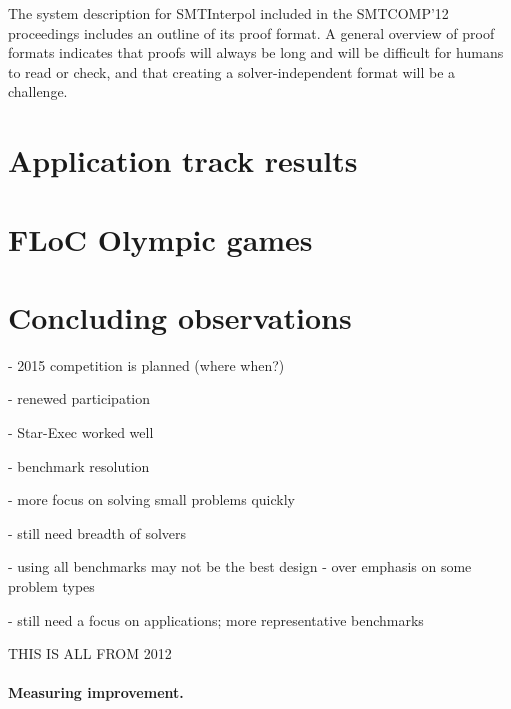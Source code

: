 \documentclass[twosize,11pt]{article}
\begin{document}
The system description for SMTInterpol included in the SMTCOMP'12 proceedings includes an outline of its proof format. A general overview of proof formats indicates that proofs will always be long and will be difficult for humans to read or check, and that creating a solver-independent format will be a challenge.

\section{Application track results}
\label{sec:application-results}

\section{FLoC Olympic games}
\label{sec:floc}

\section{Concluding observations}
\label{sec:conclusion}

- 2015 competition is planned (where when?)

- renewed participation

- Star-Exec worked well

- benchmark resolution

- more focus on solving small problems quickly

- still need breadth of solvers

- using all benchmarks may not be the best design - over emphasis on some problem types

- still need a focus on applications; more representative benchmarks

THIS IS ALL FROM 2012

\paragraph{Measuring improvement.}
\end{document}
